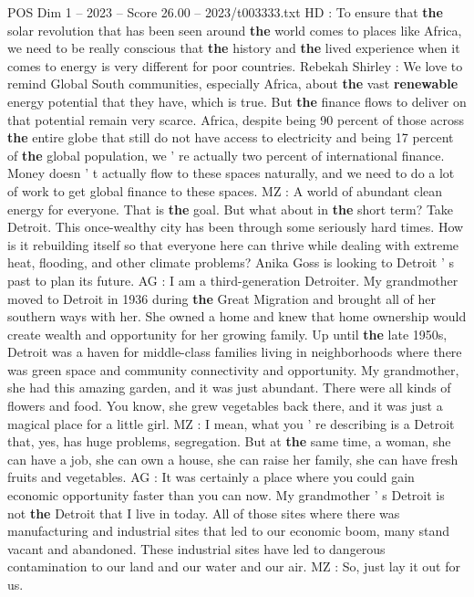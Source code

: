 \begin{textsample}{POS Dim 1 – 2023 – Score 26.00 – 2023/t003333.txt}
HD : To ensure that \textbf{the} solar revolution that has been seen around \textbf{the} world comes to places like Africa, we need to be really conscious that \textbf{the} history and \textbf{the} lived experience when it comes to energy is very different for poor countries.
Rebekah Shirley : We love to remind Global South communities, especially Africa, about \textbf{the} vast \textbf{renewable} energy potential that they have, which is true.
But \textbf{the} finance flows to deliver on that potential remain very scarce.
Africa, despite being 90 percent of those across \textbf{the} entire globe that still do not have access to electricity and being 17 percent of \textbf{the} global population, we ' re actually two percent of international finance.
Money doesn ' t actually flow to these spaces naturally, and we need to do a lot of work to get global finance to these spaces.
MZ : A world of abundant clean energy for everyone.
That is \textbf{the} goal.
But what about in \textbf{the} short term?
Take Detroit.
This once-wealthy city has been through some seriously hard times.
How is it rebuilding itself so that everyone here can thrive while dealing with extreme heat, flooding, and other climate problems?
Anika Goss is looking to Detroit ' s past to plan its future.
AG : I am a third-generation Detroiter.
My grandmother moved to Detroit in 1936 during \textbf{the} Great Migration and brought all of her southern ways with her.
She owned a home and knew that home ownership would create wealth and opportunity for her growing family.
Up until \textbf{the} late 1950s, Detroit was a haven for middle-class families living in neighborhoods where there was green space and community connectivity and opportunity.
My grandmother, she had this amazing garden, and it was just abundant.
There were all kinds of flowers and food.
You know, she grew vegetables back there, and it was just a magical place for a little girl.
MZ : I mean, what you ' re describing is a Detroit that, yes, has huge problems, segregation.
But at \textbf{the} same time, a woman, she can have a job, she can own a house, she can raise her family, she can have fresh fruits and vegetables.
AG : It was certainly a place where you could gain economic opportunity faster than you can now.
My grandmother ' s Detroit is not \textbf{the} Detroit that I live in today.
All of those sites where there was manufacturing and industrial sites that led to our economic boom, many stand vacant and abandoned.
These industrial sites have led to dangerous contamination to our land and our water and our air.
MZ : So, just lay it out for us.

\end{textsample}
